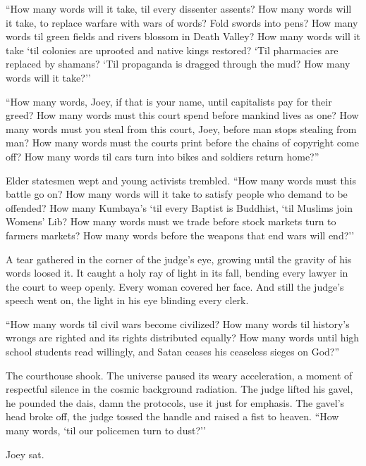 \documentclass[oneside]{book}
\begin{document}
``How many words will it take, til every dissenter assents?  How many words will it take,
to replace warfare with wars of words?  Fold swords into pens?
How many words til green fields and rivers
blossom in Death Valley?
How many words will it take `til
colonies are uprooted and native kings restored?  `Til pharmacies are replaced
by shamans?  `Til propaganda is dragged through the mud?  How many words will it take?''

``How many words, Joey, if that is your name, until capitalists pay for their greed?
How many words must this court spend before mankind lives as one?
How many words must you steal from this court,
Joey, before man stops stealing from man?  How many words must the courts print before
the chains of copyright come off?  How many words til cars turn into bikes
and soldiers return home?''

Elder statesmen wept and young activists trembled.
``How many words must this battle go on?
How many words will it take to satisfy people who demand to be offended?  How many Kumbaya's
`til every Baptist is Buddhist, `til Muslims join Womens' Lib?
How many words must we trade before stock markets turn to farmers
markets?
How many words before the weapons that end wars will end?''

A tear gathered in the corner of the judge's eye, growing until the gravity of
his words loosed it.
It caught a holy ray of light in its fall,
bending every lawyer in the court to weep openly.
Every woman covered her face.
And still the judge's speech went on, the light in his eye blinding every clerk.

``How many words til civil wars become civilized? 
How many words til history's wrongs are righted and its rights distributed equally?
How many words until high school students read willingly, 
and Satan ceases his ceaseless sieges on God?''

The courthouse shook.
The universe paused its weary
acceleration, a moment of respectful silence in the cosmic background radiation.
The judge lifted his gavel, he pounded the dais,
damn the protocols, use it just for emphasis.  The gavel's head broke off,
the judge tossed the handle and raised a fist to heaven.
``How many words, `til our policemen turn to dust?''

Joey sat.
\end{document}
